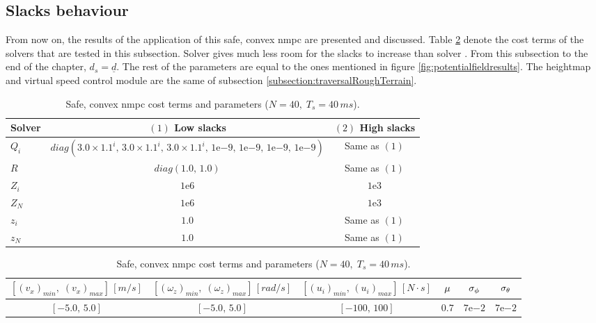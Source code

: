 \subsection{Slacks behaviour}

From now on, the results of the application of this safe, convex \acrshort{nmpc} are presented and discussed. Table \ref{tab:SafeRoughPathTrackingSpecs} denote the cost terms of the solvers that are tested in this subsection. Solver  gives much less room for the slacks to increase than solver . From this subsection to the end of the chapter, $d_s = \underline{d}$. The rest of the parameters are equal to the ones mentioned in figure \ref{fig:potentialfieldresults}. The heightmap and virtual speed control module are the same of subsection \ref{subsection:traversalRoughTerrain}.

\begin{table}[!htb]
  \caption[Safe, convex \acrshort{nmpc} cost terms and parameters.]{Safe, convex \acrshort{nmpc} cost terms and parameters ($N = 40,\; T_s = 40\,ms$).}
  \label{tab:SafeRoughPathTrackingSpecs}
  \renewcommand{\arraystretch}{1.2}
  \centering
  \begin{tabular}[]{lcc}
	\toprule
	Solver & $(1)$ Low slacks & $(2)$ High slacks \\
	\midrule
	$Q_i$ & $diag\left(3.0\times1.1^i,\,3.0\times1.1^i,\,3.0\times1.1^i,\,1\mathrm{e}{-9},\,1\mathrm{e}{-9},\,1\mathrm{e}{-9},\,1\mathrm{e}{-9}\right)$ & Same as $(1)$\\
	$R$ & $diag\left(1.0,\,1.0\right)$ & Same as $(1)$\\
	$Z_i$ & $1\mathrm{e}{6}$ & $1\mathrm{e}{3}$ \\
	$Z_N$ & $1\mathrm{e}{6}$ & $1\mathrm{e}{3}$ \\
	$z_i$ & $1.0$ & Same as $(1)$ \\
	$z_N$ & $1.0$ & Same as $(1)$ \\
  	\end{tabular}
  	\begin{tabular}[]{cccccc}
  	\toprule
  		$\left[(v_x)_{min},\; (v_x)_{max}\right]\,[m/s]$ & $\left[(\omega_z)_{min},\; (\omega_z)_{max}\right]\,[rad/s]$ & $\left[(u_i)_{min},\,(u_i)_{max}\right]\,[N \cdot s]$ & $\mu$ & $\sigma_{\phi}$ & $\sigma_{\theta}$\\
  	\midrule
  		$\left[-5.0,\,5.0\right]$ & $\left[-5.0,\,5.0\right]$ & $\left[-100,\,100\right]$ & $0.7$ & $7\mathrm{e}{-2}$ & $7\mathrm{e}{-2}$\\
  	\bottomrule
  \end{tabular}
\end{table}

